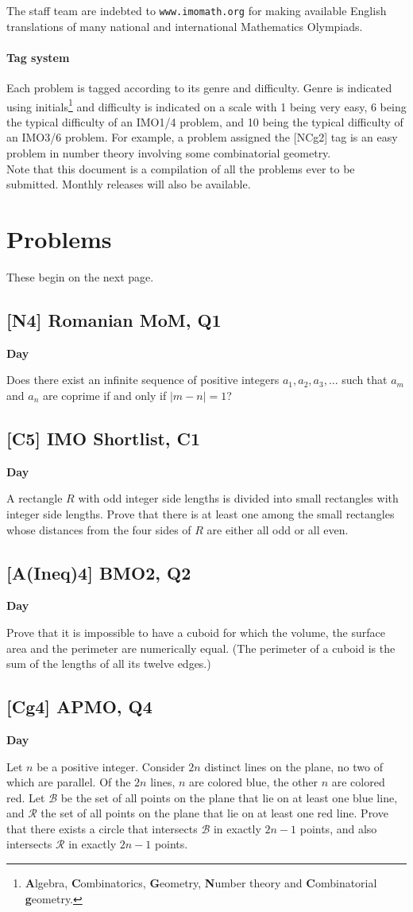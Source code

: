 \documentclass[10pt]{article}
\newcommand{\themonth}{March}
\newcommand{\theyear}{2019}
\newcounter{day}
\newcounter{solution}
\newcounter{datenumber}
\newcommand{\problem}[4][0]{
	\newpage
	\subsection{[#3] \space #2} \hfill 
	{\large\textbf{Day \arabic{day}}} %
	\begin{flushleft} #4 \end{flushleft}
	\vspace{1em}
	\addtocounter{day}{1}
	\addtocounter{datenumber}{1}
	\setcounter{solution}{1}
}
\begin{document}
The staff team are indebted to \texttt{www.imomath.org} for making available English translations of many national and international Mathematics Olympiads.

\paragraph{Tag system} Each problem is tagged according to its genre and difficulty. Genre is indicated using initials\footnote{\textbf{A}lgebra, \textbf{C}ombinatorics, \textbf{G}eometry, \textbf{N}umber theory and \textbf{C}ombinatorial \textbf{g}eometry.} and difficulty is indicated on a scale with 1 being very easy, 6 being the typical difficulty of an IMO1/4 problem, and 10 being the typical difficulty of an IMO3/6 problem. For example, a problem assigned the [NCg2] tag is an easy problem in number theory involving some combinatorial geometry.\\

Note that this document is a compilation of all the problems ever to be submitted. Monthly releases will also be available. 

\section{Problems}

These begin on the next page.

\problem[1]{2015 Romanian MoM, Q1}{N4}{Does there exist an infinite sequence of positive integers $a_1, a_2, a_3, \dots$ such that $a_m$ and $a_n$ are coprime if and only if $\lvert m - n \rvert = 1$?}

\problem[2]{2018 IMO Shortlist, C1}{C5}{A rectangle $R$ with odd integer side lengths is divided into small rectangles with integer side lengths. Prove that there is at least one among the small rectangles whose distances from the four sides of $R$ are either all odd or all even.}

\problem[3]{2014 BMO2, Q2}{A(Ineq)4}{Prove that it is impossible to have a cuboid for which the volume, the surface area and the perimeter are numerically equal. (The perimeter of a cuboid is the sum of the lengths of all its twelve edges.)}

\problem[4]{2015 APMO, Q4}{Cg4}{Let $n$ be a positive integer. Consider $2n$ distinct lines on the plane, no two of which are parallel. Of the $2n$ lines, $n$ are colored blue, the other $n$ are colored red. Let $\mathcal{B}$ be the set of all points on the plane that lie on at least one blue line, and $\mathcal{R}$ the set of all points on the plane that lie on at least one red line. Prove that there exists a circle that intersects $\mathcal{B}$ in exactly $2n-1$ points, and also intersects $\mathcal{R}$ in exactly $2n-1$ points.}
\end{document}
